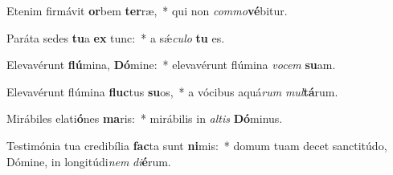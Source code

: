 \item Etenim firmávit \textbf{or}bem \textbf{ter}ræ,~* qui non \textit{com}\textit{mo}\textbf{vé}bitur.
\item Paráta sedes \textbf{tu}a \textbf{ex} tunc:~* a sǽ\textit{cu}\textit{lo} \textbf{tu} es.
\item Elevavérunt \textbf{flú}mina, \textbf{Dó}mine:~* elevavérunt flúmina \textit{vo}\textit{cem} \textbf{su}am.
\item Elevavérunt flúmina \textbf{fluc}tus \textbf{su}os,~* a vócibus aquá\textit{rum} \textit{mul}\textbf{tá}rum.
\item Mirábiles elati\textbf{ó}nes \textbf{ma}ris:~* mirábilis in \textit{al}\textit{tis} \textbf{Dó}minus.
\item Testimónia tua credibília \textbf{fac}ta sunt \textbf{ni}mis:~* domum tuam decet sanctitúdo, Dómine, in longitúdi\textit{nem} \textit{di}\textbf{é}rum.
